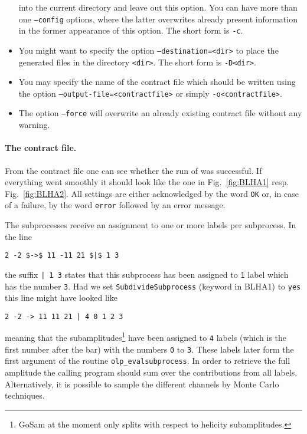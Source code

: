 \begin{itemize}
   into the current directory and leave out this option.
   You can have more than one \texttt{--config} options, where the latter
   overwrites already present information in the former appearance of this
   option. The short form is \texttt{-c}.
\item You might want to specify the option \texttt{--destination=<dir>}
   to place the generated files in the directory \texttt{<dir>}.
   The short form is \texttt{-D<dir>}.
\item You may specify the name of the contract file which should be written
   using the option \texttt{--output-file=<contractfile>} or simply
   \texttt{-o<contractfile>}.
\item The option \texttt{--force} will overwrite an already existing
   contract file without any warning. 
\end{itemize}

\paragraph{The contract file.}
From the contract file one can see whether the run of \gosam{} was successful.
If everything went smoothly it should look like the one in Fig.~\ref{fig:BLHA1}
resp. Fig.~\ref{fig:BLHA2}.
All settings are either acknowledged by the word \texttt{OK} or, in case
of a failure, by the word \texttt{error} followed by an error message.


The subprocesses receive an assignment to one or more
labels per subprocess. In the line
\begin{lstlisting}
2 -2 $->$ 11 -11 21 $|$ 1 3
\end{lstlisting}
the suffix \texttt{| 1 3}
states that this subprocess has been assigned to \texttt{1}
label which has the number \texttt{3}. 
Had we set \texttt{SubdivideSubprocess} (keyword in BLHA1)
to \texttt{yes} this line might have looked like
\begin{lstlisting}
2 -2 -> 11 11 21 | 4 0 1 2 3
\end{lstlisting}
meaning that the subamplitudes\footnote{GoSam at the moment only splits
with respect to helicity subamplitudes.} have been assigned to
\texttt{4} labels (which is the first number after the bar) with
the numbers \texttt{0} to \texttt{3}. These labels later form the
first argument of the routine \texttt{olp\_evalsubprocess}.
In order to retrieve the full amplitude the calling program should sum
over the contributions from all labels. Alternatively, it is possible to
sample the different channels by Monte Carlo techniques.


